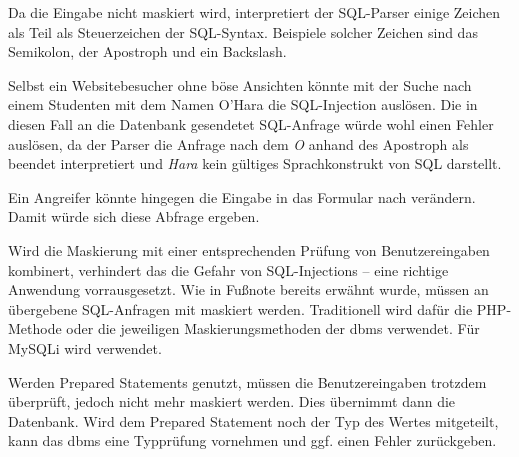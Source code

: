 Da die Eingabe nicht maskiert wird, interpretiert der SQL-Parser einige Zeichen als Teil als Steuerzeichen der SQL-Syntax. Beispiele solcher Zeichen sind das Semikolon, der Apostroph und ein Backslash.

Selbst ein Websitebesucher ohne böse Ansichten könnte mit der Suche nach einem Studenten mit dem Namen O'Hara die SQL-Injection auslösen. Die in diesen Fall an die Datenbank gesendetet SQL-Anfrage  würde wohl einen Fehler auslösen, da der Parser die Anfrage nach dem \textit{O} anhand des Apostroph als beendet interpretiert und \textit{Hara} kein gültiges Sprachkonstrukt von SQL darstellt.

Ein Angreifer könnte hingegen die Eingabe in das Formular nach  verändern. Damit würde sich diese Abfrage  ergeben.

Wird die Maskierung mit einer entsprechenden Prüfung von Benutzereingaben kombinert, verhindert das die Gefahr von SQL-Injections – eine richtige Anwendung vorrausgesetzt. Wie in Fußnote  bereits erwähnt wurde, müssen an  übergebene SQL-Anfragen mit  maskiert werden. Traditionell wird dafür die PHP-Methode  oder die jeweiligen Maskierungsmethoden der \gls{dbms} verwendet. Für MySQLi wird  verwendet.

Werden Prepared Statements genutzt, müssen die Benutzereingaben trotzdem überprüft, jedoch nicht mehr maskiert werden. Dies übernimmt dann die Datenbank. Wird dem Prepared Statement noch der Typ des Wertes mitgeteilt, kann das \gls{dbms} eine Typprüfung vornehmen und ggf. einen Fehler zurückgeben.

